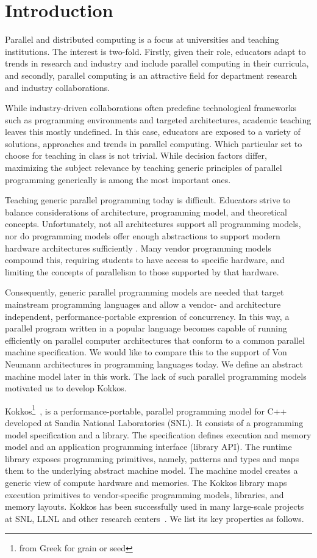
\section{Introduction}\label{chap:introduction}

Parallel and distributed computing is a focus at universities and teaching institutions. The interest is two-fold. Firstly, given their role, educators adapt to trends in research and industry and include parallel computing in their curricula, and secondly, parallel computing is an attractive field for department research and industry collaborations. 

While industry-driven collaborations often predefine technological frameworks such as programming environments and targeted architectures, academic teaching leaves this mostly undefined. In this case, educators are exposed to a variety of solutions, approaches and trends in parallel computing. Which particular set to choose for teaching in class is not trivial. While decision factors differ, maximizing the subject relevance by teaching generic principles of parallel programming generically is among the most important ones. 

Teaching generic parallel programming today is difficult. Educators strive to balance considerations of architecture, programming model, and theoretical concepts. Unfortunately, not all architectures support all programming models, nor do programming models offer enough abstractions to support modern hardware architectures sufficiently . Many vendor programming models compound this, requiring students to have access to specific hardware, and limiting the concepts of parallelism to those supported by that hardware. 

Consequently, generic parallel programming models are needed that target mainstream programming languages and allow a vendor- and architecture independent, performance-portable expression of concurrency. In this way, a parallel program written in a popular language becomes capable of running efficiently on parallel computer architectures that conform to a common parallel machine specification. We would like to compare this to the support of Von Neumann architectures in programming languages today. We define an abstract machine model later in this work. The lack of such parallel programming models motivated us to develop Kokkos.

Kokkos\footnote{from Greek for grain or seed}~\cite{KOKKOS}, is a performance-portable, parallel programming model for C++ developed at Sandia National Laboratories (SNL). It consists of a programming model specification and a library. The specification defines execution and memory model and an application programming interface (library API). The runtime library exposes programming primitives, namely, patterns and types and maps them to the underlying abstract machine model. The machine model creates a generic view of compute hardware and memories. The Kokkos library maps execution primitives to vendor-specific programming models, libraries, and memory layouts. Kokkos has been successfully used in many large-scale projects at SNL, LLNL and other research centers~\cite{KOKKOSUSECASE2}. We list its key properties as follows.

